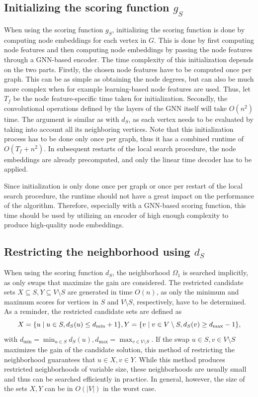 \documentclass[draft,final]{vutinfth} %
\begin{document}
\subsection{Initializing the scoring function $g_S$}

When using the scoring function $g_S$, initializing the scoring function is done by computing node embeddings for each vertex in $G$. This is done by first computing node features and then computing node embeddings by passing the node features through a GNN-based encoder. The time complexity of this initialization depends on the two parts. Firstly, the chosen node features have to be computed once per graph. This can be as simple as obtaining the node degrees, but can also be much more complex when for example learning-based node features are used. Thus, let $T_f$ be the node feature-specific time taken for initialization.  Secondly, the convolutional operations defined by the layers of the GNN itself will take $O(n^2)$ time. The argument is similar as with $d_S$, as each vertex needs to be evaluated by taking into account all its neighboring vertices. 
Note that this initialization process has to be done only once per graph, thus it has a combined runtime of $O(T_f + n^2)$. In subsequent restarts of the local search procedure, the node embeddings are already precomputed, and only the linear time decoder has to be applied. 

Since initialization is only done once per graph or once per restart of the local search procedure, the runtime should not have a great impact on the performance of the algorithm. Therefore, especially with a GNN-based scoring function, this time should be used by utilizing an encoder of high enough complexity to produce high-quality node embeddings. 

\subsection{Restricting the neighborhood using $d_S$}
When using the scoring function $d_S$, the neighborhood $\Omega_1$ is searched implicitly, as only swaps that maximize the gain are considered. 
The restricted candidate sets $X \subseteq S, Y \subseteq V \setminus S$ are generated in time $O(n)$, as only the minimum and maximum scores for vertices in $S$ and $V \setminus S$, respectively, have to be determined. As a reminder, the restricted candidate sets are defined as 
\[
    X = \{ u \mid u \in S, d_S(u) \leq d_{\min} + 1 \}, \\
    Y = \{ v \mid v \in V \setminus S, d_S(v) \geq d_{\max} - 1 \},
\]
with $d_{\min} = \min_{u \in S} d_S(u), d_{\max} = \max_{v \in V \setminus S}$. 
If the swap $u \in S,v \in V \setminus S$ maximizes the gain of the candidate solution, this method of restricting the neighborhood guarantees that $u \in X, v \in Y$.
While this method produces restricted neighborhoods of variable size, these neighborhoods are usually small and thus can be searched efficiently in practice. In general, however, the size of the sets $X, Y$ can be in $O(|V|)$ in the worst case. 
\end{document}

